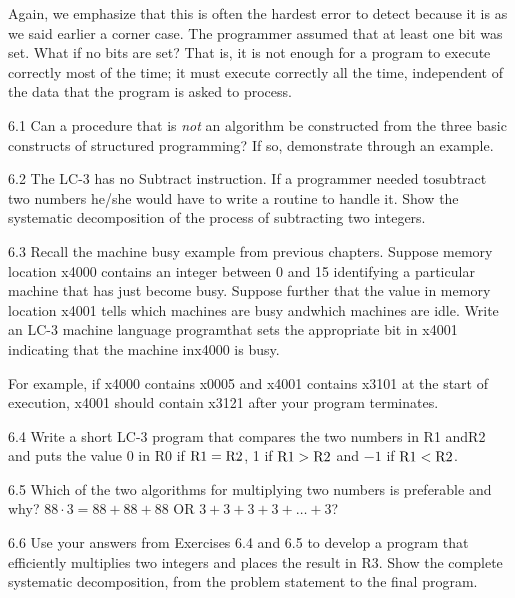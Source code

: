 \documentclass{patt}
\begin{document}
Again, we emphasize that this is often the hardest error to detect because it 
is as we said earlier a corner case.  The programmer assumed that 
at least one bit was set.  What if no bits are set?  
That is, it is not enough for a program to execute correctly
most of the time; it must execute correctly all the time, independent of the
data that the program is asked to process.  

\begin{exercises}

\item[6.1]
Can a procedure that is {\em not} an algorithm be constructed from
the three basic constructs of structured programming? If so,
demonstrate through an example.

\item[6.2]
The LC-3 has no Subtract instruction. If a programmer needed to\hfill\break subtract
two numbers he/she would have to write a routine to handle it.
Show the systematic decomposition of the process of subtracting
two integers.

\item[6.3] Recall the machine busy example from previous chapters. Suppose
memory location x4000 contains an integer between 0 and 15
identifying a particular machine that has just become busy.
Suppose further that the value in memory location x4001 tells
which machines are busy and\hfill\break which machines are idle. Write an
LC-3 machine language program\hfill\break that sets the appropriate bit
in x4001 indicating that the machine in\hfill\break x4000 is busy.

For example, if x4000 contains x0005 and x4001
contains x3101 at the start of execution, x4001 should contain
x3121 after your program terminates.

\item[6.4] Write a short LC-3 program that compares the two numbers in
  R1 and\hfill\break R2 and puts the value 0 in R0 if ${\rm R}1={\rm R}2$, 1 if
  ${\rm R}1>{\rm R}2$ and $-1$ if ${\rm R}1<{\rm R}2$.

\item[6.5]
Which of the two algorithms for multiplying two numbers is preferable
and why? $88 \cdot 3 = 88 + 88 + 88$ OR $3 + 3 + 3 + 3 + \ldots + 3$?

\item[6.6]
Use your answers from Exercises 6.4 and 6.5 to develop a program
that efficiently multiplies two integers and places the result in
R3. Show the complete systematic decomposition, from the problem
statement to the final program.\vfill\pagebreak


\end{exercises}
\end{document}
